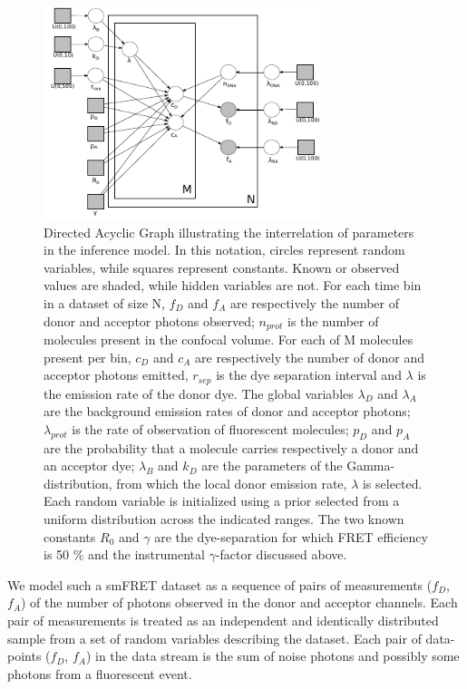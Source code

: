 \begin{figure}[b]
   \begin{center}
      \includegraphics*[width=3.25in]{inference/S2_plate_DAG_model.pdf}
      \caption{Directed Acyclic Graph illustrating the interrelation of parameters in the inference model.  In this notation, circles represent random variables, while squares represent constants.  Known or observed values are shaded, while hidden variables are not.  For each time bin in a dataset of size N, $f_D$ and $f_A$ are respectively the number of donor and acceptor photons observed; $n_{prot}$ is the number of molecules present in the confocal volume.  For each of M molecules present per bin, $c_{D}$ and $c_{A}$ are respectively the number of donor and acceptor photons emitted, $r_{sep}$ is the dye separation interval and $\lambda$ is the emission rate of the donor dye.  The global variables $\lambda_{D}$ and $\lambda_{A}$ are the background emission rates of donor and acceptor photons; $\lambda_{prot}$ is the rate of observation of fluorescent molecules; $p_{D}$ and $p_{A}$ are the probability that a molecule carries respectively a donor and an acceptor dye; $\lambda_B$ and $k_D$ are the parameters of the Gamma-distribution, from which the local donor emission rate, $\lambda$ is selected.  Each random variable is initialized using a prior selected from a uniform distribution across the indicated ranges.  The two known constants $R_0$ and $\gamma$ are the dye-separation for which FRET efficiency is 50 \% and the instrumental $\gamma$-factor discussed above.}
      \label{fig:plate_DAG}
   \end{center}
\end{figure}


We model such a smFRET dataset as a sequence of pairs of measurements ($f_D$, $f_A$) of the number of photons observed in the donor and acceptor channels. Each pair of measurements is treated as an independent and identically distributed sample from a set of random variables describing the dataset. Each pair of data-points ($f_D$, $f_A$) in the data stream is the sum of noise photons and possibly some photons from a fluorescent event. 

